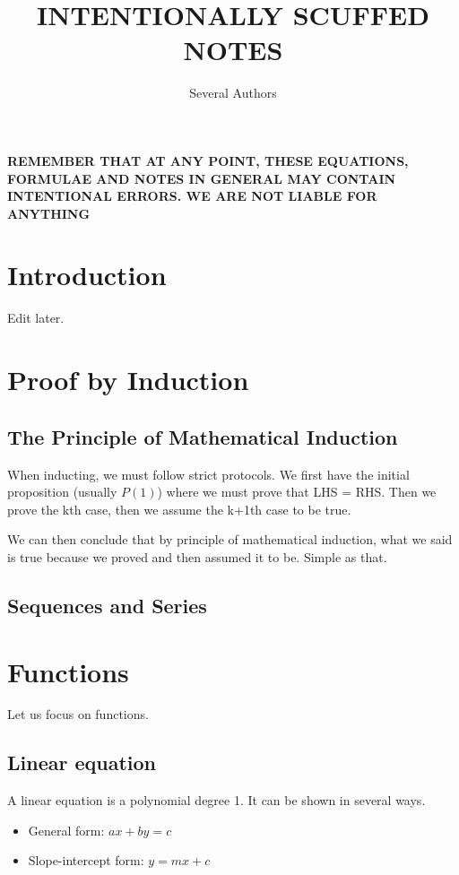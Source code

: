 \documentclass[a4paper]{article}
\theoremstyle{definition}
\newcommand{\sectionSpace}{\vspace{2em}} %
\newcommand{\subsectionSpace}{\vspace{0.5em}}
\begin{document}
\title{INTENTIONALLY SCUFFED NOTES}
\author{Several Authors}
\maketitle
\newpage



\begin{center}
    \Large 
    \textbf{
        REMEMBER THAT AT ANY POINT, THESE EQUATIONS, FORMULAE AND NOTES IN GENERAL MAY CONTAIN INTENTIONAL ERRORS. WE ARE NOT LIABLE FOR ANYTHING} 
\end{center}

\sectionSpace
\section{Introduction}
    Edit later.



\sectionSpace
\section{Proof by Induction}
    \subsection{The Principle of Mathematical Induction}
    When inducting, we must follow strict protocols. We first have the initial proposition (usually $P(1)$) where we must prove that LHS = RHS. Then we prove the kth case, then we assume the k+1th case to be true. 

    We can then conclude that by principle of mathematical induction, what we said is true because we proved and then assumed it to be. Simple as that.

    \subsectionSpace
    \subsection{Sequences and Series}



\sectionSpace
\section{Functions}
Let us focus on functions. 
    \subsection{Linear equation}
    A linear equation is a polynomial degree 1. It can be shown in several ways.
    \begin{itemize}
        \item General form: $ax + by = c$
        \item Slope-intercept form: $y = mx + c$
    \end{itemize}
\end{document}
